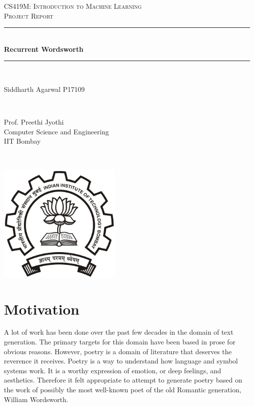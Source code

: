 \documentclass[15pt]{article}
\newcommand{\HRule}{\rule{\linewidth}{0.5mm}}
\begin{document}
\begin{center}
\textsc{\LARGE CS419M: Introduction to Machine Learning}\\[1.0cm]
\textsc{\Large Project Report}

\HRule \\[0.4cm]
{ \huge \bfseries Recurrent Wordsworth}\\[0.15cm] 
\HRule \\[1.5cm]
\end{center}

\begin{minipage}{0.5\textwidth}
\begin{flushleft} \large
Siddharth Agarwal P17109 
\end{flushleft}
\end{minipage}
~
\begin{minipage}{0.4\textwidth}
\begin{flushright} \large
Prof. Preethi Jyothi \\
Computer Science and Engineering\\
IIT Bombay

\end{flushright}
\end{minipage}\\[2cm]

\begin{center}
\includegraphics[width=60mm]{IIT_Bombay_logo.png}
\end{center}

\bigskip

\newpage
\tableofcontents
\newpage

\section{Motivation}
A lot of work has been done over the past few decades in the domain of text generation. The primary targets for this domain have been based in prose for obvious reasons.  However, poetry is a domain of literature that deserves the reverence it receives. Poetry is a way to understand how language and symbol systems work. It is a worthy expression of emotion, or deep feelings, and aesthetics. Therefore it felt appropriate to attempt to generate poetry based on the work of possibly the most well-known poet of the old Romantic generation, William Wordsworth.
\end{document}

